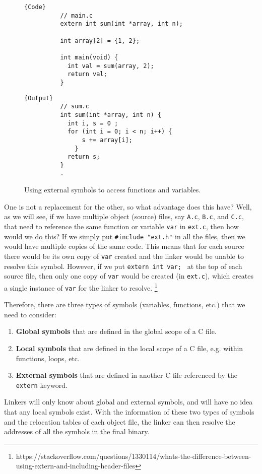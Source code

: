       \begin{figure}[H]
        \centering 
        \noindent\begin{minipage}{.50\textwidth}
        \begin{lstlisting}[]{Code}
          // main.c
          extern int sum(int *array, int n); 

          int array[2] = {1, 2};

          int main(void) {
            int val = sum(array, 2); 
            return val; 
          }
        \end{lstlisting}
        \end{minipage}
        \hfill
        \begin{minipage}{.49\textwidth}
        \begin{lstlisting}[]{Output}
          // sum.c
          int sum(int *array, int n) {
            int i, s = 0 ; 
            for (int i = 0; i < n; i++) {
                s += array[i];
              }
            return s;
          }
          .
        \end{lstlisting}
        \end{minipage}
        \caption{Using external symbols to access functions and variables.} 
        \label{fig:external_symbols_example}
      \end{figure}
      
      One is not a replacement for the other, so what advantage does this have? Well, as we will see, if we have multiple object (source) files, say \texttt{A.c}, \texttt{B.c}, and \texttt{C.c}, that need to reference the same function or variable \texttt{var} in \texttt{ext.c}, then how would we do this? If we simply put \texttt{\#include "ext.h"} in all the files, then we would have multiple copies of the same code. This means that for each source there would be its own copy of \texttt{var} created and the linker would be unable to resolve this symbol. However, if we put \texttt{extern int var; } at the top of each source file, then only one copy of \texttt{var} would be created (in \texttt{ext.c}), which creates a single instance of \texttt{var} for the linker to resolve. \footnote{https://stackoverflow.com/questions/1330114/whats-the-difference-between-using-extern-and-including-header-files}

      Therefore, there are three types of symbols (variables, functions, etc.) that we need to consider: 
      \begin{enumerate}
        \item \textbf{Global symbols} that are defined in the global scope of a C file. 
        \item \textbf{Local symbols} that are defined in the local scope of a C file, e.g. within functions, loops, etc. 
        \item \textbf{External symbols} that are defined in another C file referenced by the \texttt{extern} keyword.
      \end{enumerate}
      Linkers will only know about global and external symbols, and will have no idea that any local symbols exist. With the information of these two types of symbols and the relocation tables of each object file, the linker can then resolve the addresses of all the symbols in the final binary. 

